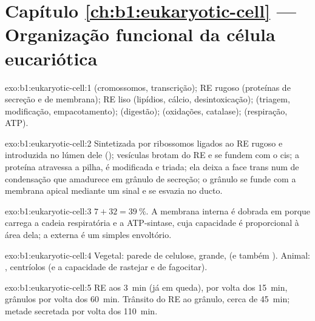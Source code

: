 \section*{Capítulo \ref{ch:b1:eukaryotic-cell} --- Organização funcional da célula eucariótica}

\begin{solution}{exo:b1:eukaryotic-cell:1}
 (cromossomos, transcrição); RE rugoso (proteínas de secreção e de
membrana); RE liso (lipídios, cálcio, desintoxicação);  (triagem,
modificação, empacotamento);  (digestão); 
(oxidações, catalase);  (respiração, ATP).
\end{solution}

\begin{solution}{exo:b1:eukaryotic-cell:2}
Sintetizada por ribossomos ligados ao RE rugoso e introduzida no lúmen
dele (); vesículas brotam do RE e se fundem com o 
cis; a proteína atravessa a pilha, é modificada e triada; ela deixa a
face trans num  de condensação que amadurece em grânulo de
secreção; o grânulo se funde com a membrana apical mediante um sinal e
se esvazia no ducto.
\end{solution}

\begin{solution}{exo:b1:eukaryotic-cell:3}
$7 + 32 = \qty{39}{\%}$. A membrana interna é dobrada em  porque
carrega a cadeia respiratória e a ATP-sintase, cuja capacidade é
proporcional à área dela; a externa é um simples envoltório.
\end{solution}

\begin{solution}{exo:b1:eukaryotic-cell:4}
Vegetal: parede de celulose,  grande,  (e também
). Animal: , centríolos (e a capacidade de
rastejar e de fagocitar).
\end{solution}

\begin{solution}{exo:b1:eukaryotic-cell:5}
RE aos \qty{3}{min} (já em queda),  por volta dos \qty{15}{min},
grânulos por volta dos \qty{60}{min}. Trânsito do RE ao grânulo, cerca
de \qty{45}{min}; metade secretada por volta dos \qty{110}{min}.
\end{solution}

